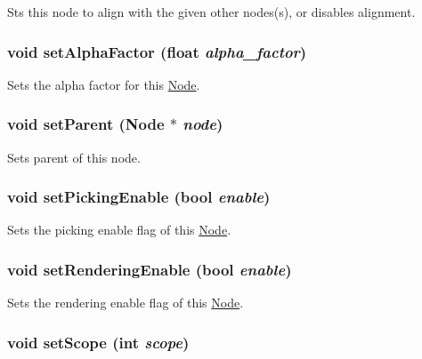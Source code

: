 Sts this node to align with the given other nodes(s), or disables alignment. \hypertarget{classm3g_1_1Node_b33c321ce240770e5eb64d0e20ea61cc}{
\subsubsection[{setAlphaFactor}]{\setlength{\rightskip}{0pt plus 5cm}void setAlphaFactor (float {\em alpha\_\-factor})}}
\label{classm3g_1_1Node_b33c321ce240770e5eb64d0e20ea61cc}


Sets the alpha factor for this \hyperlink{classm3g_1_1Node}{Node}. \hypertarget{classm3g_1_1Node_880ecc7c1c091f7607eeae12ed100a9a}{
\subsubsection[{setParent}]{\setlength{\rightskip}{0pt plus 5cm}void setParent ({\bf Node} $\ast$ {\em node})}}
\label{classm3g_1_1Node_880ecc7c1c091f7607eeae12ed100a9a}


Sets parent of this node. \hypertarget{classm3g_1_1Node_4f9296202713ac56ccae72d5e0c21d96}{
\subsubsection[{setPickingEnable}]{\setlength{\rightskip}{0pt plus 5cm}void setPickingEnable (bool {\em enable})}}
\label{classm3g_1_1Node_4f9296202713ac56ccae72d5e0c21d96}


Sets the picking enable flag of this \hyperlink{classm3g_1_1Node}{Node}. \hypertarget{classm3g_1_1Node_58981ef7aea1bf0e630bcc065b2987e9}{
\subsubsection[{setRenderingEnable}]{\setlength{\rightskip}{0pt plus 5cm}void setRenderingEnable (bool {\em enable})}}
\label{classm3g_1_1Node_58981ef7aea1bf0e630bcc065b2987e9}


Sets the rendering enable flag of this \hyperlink{classm3g_1_1Node}{Node}. \hypertarget{classm3g_1_1Node_55f324f307a01705b9094a73af4ecd68}{
\subsubsection[{setScope}]{\setlength{\rightskip}{0pt plus 5cm}void setScope (int {\em scope})}}
\label{classm3g_1_1Node_55f324f307a01705b9094a73af4ecd68}



